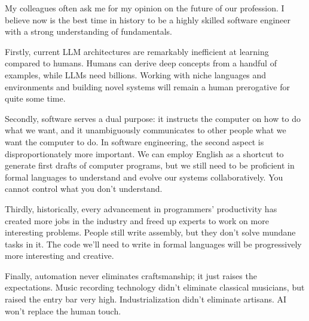 \documentclass{article}
\begin{document}
My colleagues often ask me for my opinion on the future of our profession.
I believe now is the best time in history to be a highly skilled software engineer with a strong understanding of fundamentals.

Firstly, current LLM architectures are remarkably inefficient at learning compared to humans.
Humans can derive deep concepts from a handful of examples,
while LLMs need billions.
Working with niche languages and environments and building novel systems
will remain a human prerogative for quite some time.

Secondly, software serves a dual purpose: it instructs the computer on how to do what we want,
and it unambiguously communicates to other people what we want the computer to do.
In software engineering, the second aspect is disproportionately more important.
We can employ English as a shortcut to generate first drafts of computer programs,
but we still need to be proficient in formal languages to understand and evolve our systems collaboratively.
You cannot control what you don't understand.

Thirdly, historically, every advancement in programmers' productivity has created more jobs in the industry
and freed up experts to work on more interesting problems.
People still write assembly, but they don’t solve mundane tasks in it.
The code we'll need to write in formal languages will be progressively more interesting and creative.

Finally, automation never eliminates craftsmanship; it just raises the expectations.
Music recording technology didn't eliminate classical musicians, but raised the entry bar very high.
Industrialization didn't eliminate artisans.
AI won’t replace the human touch.
\end{document}
